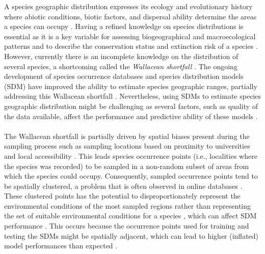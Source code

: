 A species geographic distribution expresses its ecology and evolutionary history \parencite{brown1995, gaston2003} where abiotic conditions, biotic factors, and dispersal ability determine the areas a species can occupy \parencite{soberon2005}. Having a refined knowledge on species distributions is essential as it is a key variable for assessing biogeographical and macroecological patterns \parencite{hortal2015, herkt2017} and to describe the conservation status and extinction risk of a species \parencite{cardillo2008, lee2011}. However, currently there is an incomplete knowledge on the distribution of several species, a shortcoming called the \textit{Wallacean shortfall} \parencite{lomolino2004, whittaker2005, hortal2015}. The ongoing development of species occurrence databases and species distribution models (SDM) have improved the ability to estimate species geographic ranges, partially addressing this Wallacean shortfall \parencite{peterson2011,jetz2012,terribile2018}. Nevertheless, using SDMs to estimate species geographic distribution might be challenging as several factors, such as quality of the data available, affect the performance and predictive ability of these models \parencite{santini2020}.


\paragraph*{}
The Wallacean shortfall is partially driven by spatial biases present during the sampling process such as sampling locations based on proximity to universities and local accessibility \parencite{moerman2006,vale2012,sousa2014,oliveira2016}. This leads species occurrence points (i.e., localities where the species was recorded) to be sampled in a non-random subset of areas from which the species could occupy. Consequently, sampled occurrence points tend to be spatially clustered, a problem that is often observed in online databases \parencite{beck2014, inman2021}. These clustered points has the potential to disproportionately represent the environmental conditions of the most sampled regions rather than representing the set of suitable environmental conditions for a species \parencite{kadmon2004, anderson2011}, which can affect SDM performance \parencite{veloz2009,beck2014}. This occurs because the occurrence points used for training and testing the SDMs might be spatially adjacent, which can lead to higher (inflated) model performances than expected \parencite{bahn2013,radosavljevic2014}. 
 


